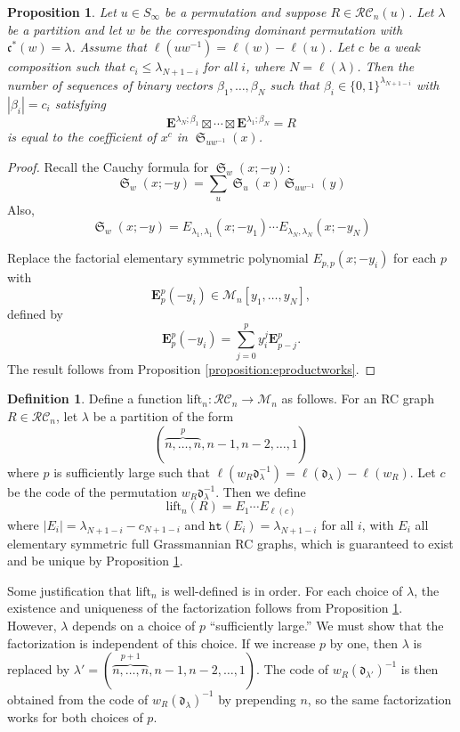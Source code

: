 \documentclass[a4paper,fleqn]{cas-sc}
\newtheorem{proposition}[lemma]{Proposition}
\theoremstyle{definition}
\newtheorem{definition}[lemma]{Definition}
\theoremstyle{remark}
\numberwithin{equation}{subsection}
\DeclareMathOperator{\sch}{\mathfrak{S}}
\newcommand{\wof}[1]{w_{#1}}
\newcommand{\hr}{\mathtt{ht}}
\newcommand{\RC}{\mathcal{RC}}
\newcommand{\dom}{\mathfrak{d}}
\newcommand{\code}{\mathfrak{c}}
\begin{document}
\begin{proposition} \label{proposition:elemfactor}
  Let $u\in S_\infty$ be a permutation and suppose $R\in \RC_n(u)$. Let $\lambda$ be a partition and let $w$ be the corresponding dominant permutation with $\code^*(w)=\lambda$. Assume that $\ell(uw^{-1}) = \ell(w)-\ell(u)$. Let $c$ be a weak composition such that $c_i\leq \lambda_{N + 1 - i}$ for all $i$, where $N=\ell(\lambda)$. Then the number of sequences of binary vectors $\beta_1,\ldots,\beta_N$ such that $\beta_i\in\{0,1\}^{\lambda_{N + 1 - i}}$ with $|\beta_i|=c_i$ satisfying
  $$\mathbf{E}^{\lambda_N;\beta_1}\boxtimes\cdots\boxtimes \mathbf{E}^{\lambda_1;\beta_N} = R$$
is equal to the coefficient of $x^c$ in $\sch_{uw^{-1}}(x)$.
\end{proposition}
\begin{proof}
  Recall the Cauchy formula for $\sch_w(x;-y)$:
  $$\sch_w(x;-y)=\sum_u \sch_u(x)\sch_{uw^{-1}}(y)$$
  Also,
  $$\sch_w(x;-y) = E_{\lambda_1,\lambda_1}(x;-y_1)\cdots E_{\lambda_N,\lambda_N}(x;-y_N)$$

Replace the factorial elementary symmetric polynomial $E_{p,p}(x;-y_i)$ for each $p$ with
$$\mathbf{E}_p^p(-y_i)\in \mathcal{M}_n[y_1,\ldots,y_N],$$
defined by
$$\mathbf{E}_p^p(-y_i) = \sum_{j=0}^p y_i^j \mathbf{E}_{p-j}^p.$$ 
The result follows from Proposition \ref{proposition:eproductworks}.
\end{proof}



\begin{definition}
  Define a function $\mathrm{lift}_n:\RC_n\to \mathcal{M}_n$ as follows. For an RC graph $R\in \RC_n$, let $\lambda$ be a partition of the form 
$$(\overbrace{n,\ldots,n}^{p},n-1,n-2,\ldots,1)$$
where $p$ is sufficiently large such that $\ell(\wof{R}\dom_\lambda^{-1}) = \ell(\dom_\lambda) - \ell(\wof{R})$.  Let $c$ be the code of the permutation $\wof{R}\dom_\lambda^{-1}$. Then we define
$$\mathrm{lift}_n(R) = E_1 \cdots  E_{\ell(c)}$$
where $|E_i| = \lambda_{N + 1 - i} - c_{N + 1 - i}$ and $\hr(E_i) = \lambda_{N+1-i}$ for all $i$, with $E_i$ all elementary symmetric full Grassmannian RC graphs, which is guaranteed to exist and be unique by Proposition \ref{proposition:elemfactor}. 
\end{definition}

Some justification that $\mathrm{lift}_n$ is well-defined is in order. For each choice of $\lambda$, the existence and uniqueness of the factorization follows from Proposition \ref{proposition:elemfactor}. However, $\lambda$ depends on a choice of $p$ ``sufficiently large.'' We must show that the factorization is independent of this choice. If we increase $p$ by one, then $\lambda$ is replaced by $\lambda' = (\overbrace{n,\ldots,n}^{p+1},n-1,n-2,\ldots,1)$. The code of $\wof{R}(\dom_{\lambda'})^{-1}$ is then obtained from the code of $\wof{R}(\dom_\lambda)^{-1}$ by prepending $n$, so the same factorization works for both choices of $p$.
\end{document}
